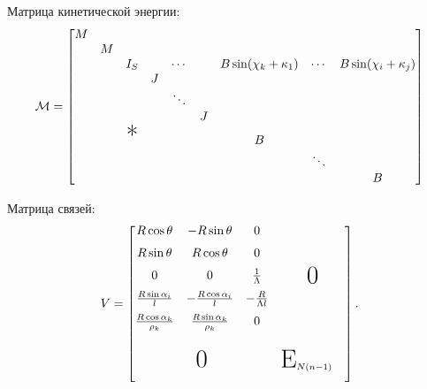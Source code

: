 Матрица кинетической энергии:
$$
\M = \begin{bmatrix}
    M &   &               &   &        &   &                        &        &                        \\
      & M &               &   &        &   &                        &        &                        \\
      &   & I_S           &   & \cdots &   & B\sin(\chi_k+\kappa_1) & \cdots & B\sin(\chi_i+\kappa_j) \\
      &   &               & J &        &   &                        &        &                        \\
      &   &               &   & \ddots &   &                        &        &                        \\
      &   &               &   &        & J &                        &        &                        \\
      &   & \text{\huge*} &   &        &   & B                      &        &                        \\
      &   &               &   &        &   &                        & \ddots &                        \\
      &   &               &   &        &   &                        &        & B                      \\
\end{bmatrix}
$$


Матрица связей:
$$
V = \begin{bmatrix}
    \begin{matrix}
        R\cos\theta                  & -R\sin\theta                  & 0                    \\[6pt]
        R\sin\theta                  &  R\cos\theta                  & 0                    \\[6pt]
        0                            & 0                             & \frac{1}{\Lambda}    \\[6pt]
        \frac{R\sin\alpha_i}{l}      & -\frac{R\cos\alpha_i}{l}      & -\frac{R}{\Lambda l} \\[6pt]
        \frac{R\cos\alpha_k}{\rho_k} &  \frac{R\sin\alpha_k}{\rho_k} & 0                    \\[6pt]
    \end{matrix}   & \text{\huge 0}                \\[50pt]
    \text{\huge 0} & \text{\huge E}_{N(n-1)} \quad \\[10pt]
\end{bmatrix}.
$$

